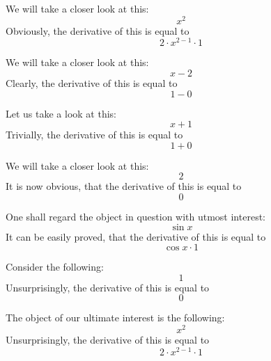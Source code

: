\documentclass{article}
\begin{document}
We will take a closer look at this:
\begin{equation}
x ^{2 } 
\end{equation}
Obviously, the derivative of this is equal to
\begin{equation}
2 \cdot x ^{2 - 1 } \cdot 1 
\end{equation}

We will take a closer look at this:
\begin{equation}
x - 2 
\end{equation}
Clearly, the derivative of this is equal to
\begin{equation}
1 - 0 
\end{equation}

Let us take a look at this:
\begin{equation}
x + 1 
\end{equation}
Trivially, the derivative of this is equal to
\begin{equation}
1 + 0 
\end{equation}

We will take a closer look at this:
\begin{equation}
2 
\end{equation}
It is now obvious, that the derivative of this is equal to
\begin{equation}
0 
\end{equation}

One shall regard the object in question with utmost interest:
\begin{equation}
\sin x 
\end{equation}
It can be easily proved, that the derivative of this is equal to
\begin{equation}
\cos x \cdot 1 
\end{equation}

Consider the following:
\begin{equation}
1 
\end{equation}
Unsurprisingly, the derivative of this is equal to
\begin{equation}
0 
\end{equation}

The object of our ultimate interest is the following:
\begin{equation}
x ^{2 } 
\end{equation}
Unsurprisingly, the derivative of this is equal to
\begin{equation}
2 \cdot x ^{2 - 1 } \cdot 1 
\end{equation}
\end{document}

